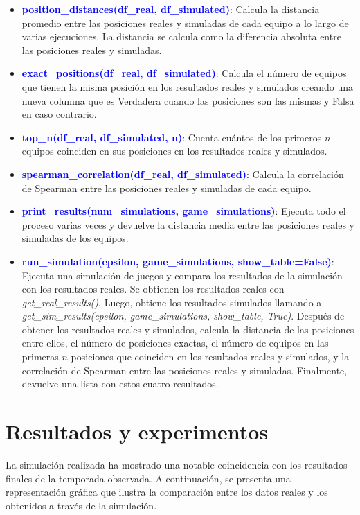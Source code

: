 \documentclass{article}
\begin{document}
\begin{itemize}
            \item[\checkmark] \textbf{\textcolor{blue}{position\_distances(df\_real, df\_simulated)}}: Calcula la distancia promedio entre las posiciones reales y simuladas de cada equipo a lo largo de varias ejecuciones. La distancia se calcula como la diferencia absoluta entre las posiciones reales y simuladas.
            \item[\checkmark] \textbf{\textcolor{blue}{exact\_positions(df\_real, df\_simulated)}}: Calcula el número de equipos que tienen la misma posición en los resultados reales y simulados creando una nueva columna que es Verdadera cuando las posiciones son las mismas y Falsa en caso contrario.
            \item[\checkmark] \textbf{\textcolor{blue}{top\_n(df\_real, df\_simulated, n)}}: Cuenta cuántos de los primeros $n$ equipos coinciden en sus posiciones en los resultados reales y simulados. 
            \item[\checkmark] \textbf{\textcolor{blue}{spearman\_correlation(df\_real, df\_simulated)}}: Calcula la correlación de Spearman entre las posiciones reales y simuladas de cada equipo.
            \item[\checkmark] \textbf{\textcolor{blue}{print\_results(num\_simulations, game\_simulations)}}: Ejecuta todo el proceso varias veces y devuelve la distancia media entre las posiciones reales y simuladas de los equipos.
            \item[\checkmark] \textbf{\textcolor{blue}{run\_simulation(epsilon, game\_simulations, show\_table=False)}}: Ejecuta una simulación de juegos y compara los resultados de la simulación con los resultados reales. Se obtienen los resultados reales con \textit{get\_real\_results()}. Luego, obtiene los resultados simulados llamando a \textit{get\_sim\_results(epsilon, game\_simulations, show\_table, True)}. Después de obtener los resultados reales y simulados, calcula la distancia de las posiciones entre ellos, el número de posiciones exactas, el número de equipos en las primeras $n$ posiciones que coinciden en los resultados reales y simulados, y la correlación de Spearman entre las posiciones reales y simuladas. Finalmente, devuelve una lista con estos cuatro resultados.
        \end{itemize}

    \section{Resultados y experimentos}
        La simulación realizada ha mostrado una notable coincidencia con los resultados finales de la temporada observada. A continuación, se presenta una representación gráfica que ilustra la comparación entre los datos reales y los obtenidos a través de la simulación.
\end{document}
